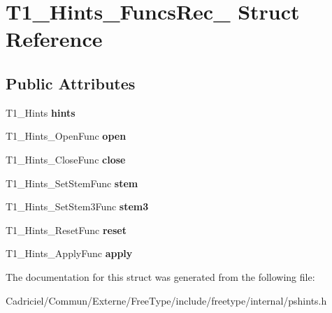 \hypertarget{struct_t1___hints___funcs_rec__}{\section{T1\-\_\-\-Hints\-\_\-\-Funcs\-Rec\-\_\- Struct Reference}
\label{struct_t1___hints___funcs_rec__}
}
\subsection*{Public Attributes}
\begin{DoxyCompactItemize}
\item 
\hypertarget{struct_t1___hints___funcs_rec___a6a58f489e362b746703b4caae91349ef}{T1\-\_\-\-Hints {\bfseries hints}}\label{struct_t1___hints___funcs_rec___a6a58f489e362b746703b4caae91349ef}

\item 
\hypertarget{struct_t1___hints___funcs_rec___a41ca09a042c8e92f64822f19486a622a}{T1\-\_\-\-Hints\-\_\-\-Open\-Func {\bfseries open}}\label{struct_t1___hints___funcs_rec___a41ca09a042c8e92f64822f19486a622a}

\item 
\hypertarget{struct_t1___hints___funcs_rec___aa6d879215bff42f4b3851a9151c78505}{T1\-\_\-\-Hints\-\_\-\-Close\-Func {\bfseries close}}\label{struct_t1___hints___funcs_rec___aa6d879215bff42f4b3851a9151c78505}

\item 
\hypertarget{struct_t1___hints___funcs_rec___abdbf955a1fc9b19799ed8ea8137c9381}{T1\-\_\-\-Hints\-\_\-\-Set\-Stem\-Func {\bfseries stem}}\label{struct_t1___hints___funcs_rec___abdbf955a1fc9b19799ed8ea8137c9381}

\item 
\hypertarget{struct_t1___hints___funcs_rec___acc1edae831d279929f93c8eb1872daa3}{T1\-\_\-\-Hints\-\_\-\-Set\-Stem3\-Func {\bfseries stem3}}\label{struct_t1___hints___funcs_rec___acc1edae831d279929f93c8eb1872daa3}

\item 
\hypertarget{struct_t1___hints___funcs_rec___a5646878cdabd593389e28cffd8b077cb}{T1\-\_\-\-Hints\-\_\-\-Reset\-Func {\bfseries reset}}\label{struct_t1___hints___funcs_rec___a5646878cdabd593389e28cffd8b077cb}

\item 
\hypertarget{struct_t1___hints___funcs_rec___a3fb5f01de31da9efb2ae8f5251b4d506}{T1\-\_\-\-Hints\-\_\-\-Apply\-Func {\bfseries apply}}\label{struct_t1___hints___funcs_rec___a3fb5f01de31da9efb2ae8f5251b4d506}

\end{DoxyCompactItemize}


The documentation for this struct was generated from the following file\-:\begin{DoxyCompactItemize}
\item 
Cadriciel/\-Commun/\-Externe/\-Free\-Type/include/freetype/internal/pshints.\-h\end{DoxyCompactItemize}
